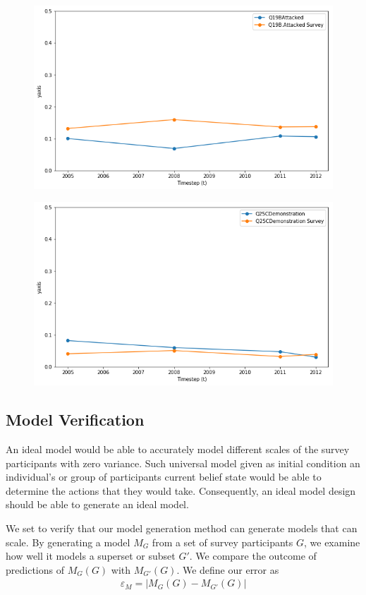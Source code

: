 {%

\begin{figure}
	\centering
	\includegraphics[width=0.7\linewidth]{Images/attacked}
	\caption{}
	\label{fig:attacked}
\end{figure}
\begin{figure}
	\centering
	\includegraphics[width=0.7\linewidth]{Images/demonstration}
	\caption{}
	\label{fig:demonstration}
\end{figure}


\subsection{Model Verification}\label{sec:granularity}

An ideal model would be able to accurately model different scales of the survey participants with zero variance. Such universal model given as initial condition an individual's or group of participants current belief state would be able to determine the actions that they would take. Consequently, an ideal model design should be able to generate an ideal model. 

We set to verify that our model generation method can generate models that can scale. By generating a model $M_G$ from a set of survey participants $G$, we examine how well it models a superset or subset $G'$. We compare the outcome of predictions of $M_{G}(G)$ with $M_{G'}(G)$. We define our error as
\begin{eqnarray}
\varepsilon_{M} = |M_G(G) - M_{G'}(G)|
\end{eqnarray}

}
